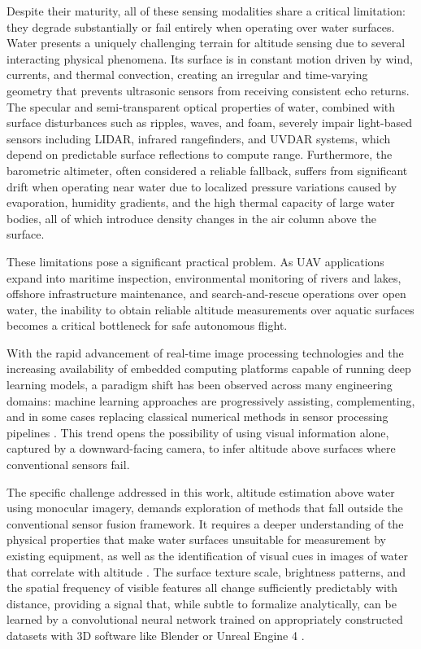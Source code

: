Despite their maturity, all of these sensing modalities share a critical limitation: they degrade substantially or fail entirely when operating over water surfaces. Water presents a uniquely challenging terrain for altitude sensing due to several interacting physical phenomena. Its surface is in constant motion driven by wind, currents, and thermal convection, creating an irregular and time-varying geometry that prevents ultrasonic sensors from receiving consistent echo returns. The specular and semi-transparent optical properties of water, combined with surface disturbances such as ripples, waves, and foam, severely impair light-based sensors including LIDAR, infrared rangefinders, and UVDAR systems, which depend on predictable surface reflections to compute range. Furthermore, the barometric altimeter, often considered a reliable fallback, suffers from significant drift when operating near water due to localized pressure variations caused by evaporation, humidity gradients, and the high thermal capacity of large water bodies, all of which introduce density changes in the air column above the surface.

These limitations pose a significant practical problem. As UAV applications expand into maritime inspection, environmental monitoring of rivers and lakes, offshore infrastructure maintenance, and search-and-rescue operations over open water, the inability to obtain reliable altitude measurements over aquatic surfaces becomes a critical bottleneck for safe autonomous flight.\cite{UAVCivilAppsJATM}

With the rapid advancement of real-time image processing technologies and the increasing availability of embedded computing platforms capable of running deep learning models, a paradigm shift has been observed across many engineering domains: machine learning approaches are progressively assisting, complementing, and in some cases replacing classical numerical methods in sensor processing pipelines \cite{TUAVSensorDNN}. This trend opens the possibility of using visual information alone, captured by a downward-facing camera, to infer altitude above surfaces where conventional sensors fail.

The specific challenge addressed in this work, altitude estimation above water using monocular imagery, demands exploration of methods that fall outside the conventional sensor fusion framework. It requires a deeper understanding of the physical properties that make water surfaces unsuitable for measurement by existing equipment, as well as the identification of visual cues in images of water that correlate with altitude \cite{VIAENetAltitude}. The surface texture scale, brightness patterns, and the spatial frequency of visible features all change sufficiently predictably with distance, providing a signal that, while subtle to formalize analytically, can be learned by a convolutional neural network trained on appropriately constructed datasets with 3D software like Blender or Unreal Engine 4 \cite{WaterDepthSpecular}.


